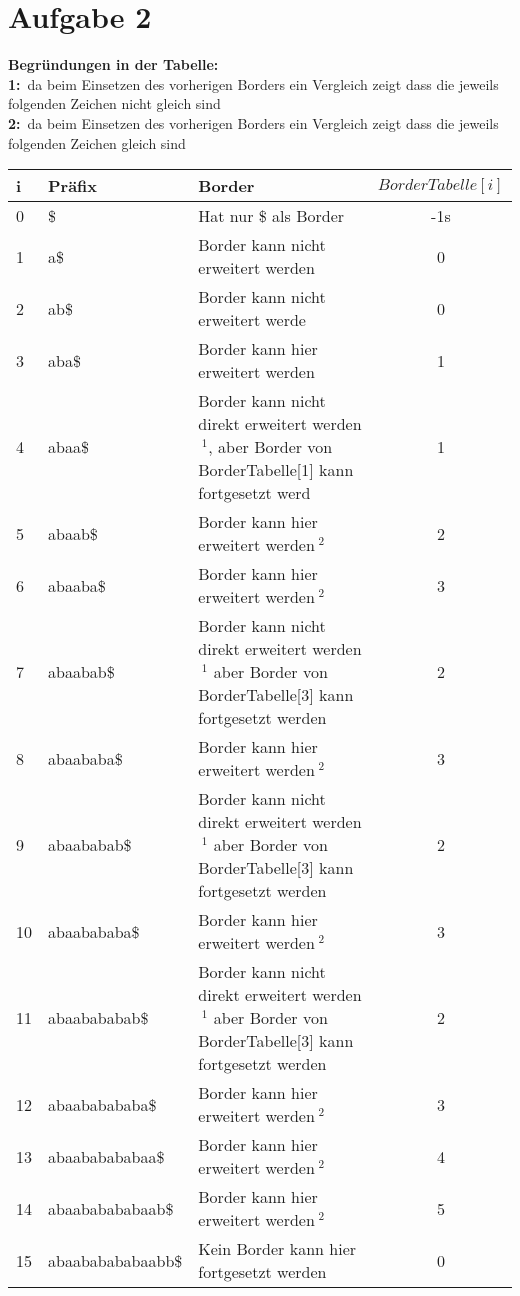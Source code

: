 \documentclass[a4paper,10pt,oneside,leqno]{scrartcl}
\begin{document}
\section*{Aufgabe 2}
\textbf{Begründungen in der Tabelle:}\\
\textbf{1:}\ da beim Einsetzen des vorherigen Borders ein Vergleich zeigt dass die jeweils folgenden Zeichen nicht gleich sind\\
\textbf{2:}\ da beim Einsetzen des vorherigen Borders ein Vergleich zeigt dass die jeweils folgenden Zeichen gleich sind\\
\begin{tabular}{l|l|p{8cm}|c}
\textbf{i} & \textbf{Präfix} & \textbf{Border} & \textbf{$BorderTabelle[i]$}\\\hline
0 &\$ & Hat nur \$ als Border & -1s\\
1 &a\$ & Border kann nicht erweitert werden & 0\\
2 &ab\$ & Border kann nicht erweitert werde & 0\\
3 &aba\$ & Border kann hier erweitert werden & 1\\
4 &abaa\$ & Border kann nicht direkt erweitert werden$\ ^1$, aber Border von BorderTabelle[1] kann fortgesetzt werd & 1\\
5 &abaab\$ & Border kann hier erweitert werden$\ ^2$ & 2\\
6 &abaaba\$ & Border kann hier erweitert werden$\ ^2$ & 3\\
7 &abaabab\$ & Border kann nicht direkt erweitert werden$\ ^1$ aber Border von BorderTabelle[3] kann fortgesetzt werden& 2\\
8 &abaababa\$ & Border kann hier erweitert werden$\ ^2$ & 3\\
9 &abaababab\$ & Border kann nicht direkt erweitert werden$\ ^1$ aber Border von BorderTabelle[3] kann fortgesetzt werden & 2\\
10&abaabababa\$ & Border kann hier erweitert werden$\ ^2$ & 3\\
11&abaabababab\$ & Border kann nicht direkt erweitert werden$\ ^1$ aber Border von BorderTabelle[3] kann fortgesetzt werden & 2\\
12&abaababababa\$ & Border kann hier erweitert werden$\ ^2$ & 3\\
13&abaababababaa\$ & Border kann hier erweitert werden$\ ^2$ & 4\\
14&abaababababaab\$ & Border kann hier erweitert werden$\ ^2$ & 5\\
15&abaababababaabb\$ & Kein Border kann hier fortgesetzt werden & 0
\end{tabular}
\end{document}
